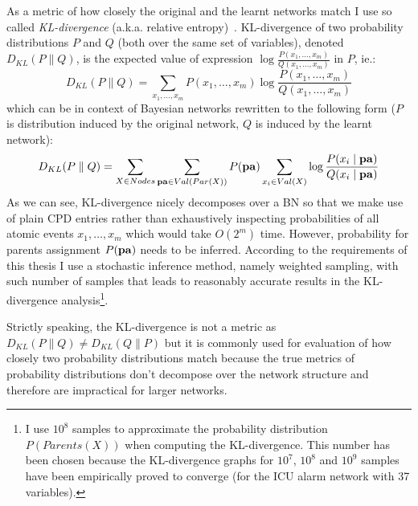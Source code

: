 \documentclass[english,cover]{fitthesis} %
\newcommand{\term}[1]{\emph{#1}}           %
\newcommand{\vars}[1]{{\bold{#1}}}         %
\begin{document}
As a metric of how closely the original and the learnt networks match I use so called \term{KL-divergence} (a.k.a. relative entropy)~\cite{pgm}. KL-divergence of two probability distributions $P$ and $Q$ (both over the same set of variables), denoted $D_{KL}(P \parallel Q)$, is the expected value of expression $\log \frac{P(x_1,\dots,x_m)}{Q(x_1,\dots,x_m)}$ in $P$, ie.:
\begin{equation*}
D_{KL}(P \parallel Q) = \sum_{x_1,\dots,x_m} P(x_1,\dots,x_m) \log \frac{P(x_1,\dots,x_m)}{Q(x_1,\dots,x_m)}
\end{equation*}
which can be in context of Bayesian networks rewritten to the following form ($P$ is distribution induced by the original network, $Q$ is induced by the learnt network):
\begin{equation*}
D_{KL}(P \parallel Q) = \sum_{X \in Nodes} \sum_{\vars{pa} \in Val(Par(X))} P(\vars{pa}) \sum_{x_i \in Val(X)} \log \frac{P(x_i \mid \vars{pa})}{Q(x_i \mid \vars{pa})}
\end{equation*}
As we can see, KL-divergence nicely decomposes over a BN so that we make use of plain CPD entries rather than exhaustively inspecting probabilities of all atomic events $x_1, \dots, x_m$ which would take $O(2^m)$ time. However, probability for parents assignment $P(\vars{pa})$ needs to be inferred. According to the requirements of this thesis I use a stochastic inference method, namely weighted sampling, with such number of samples that leads to reasonably accurate results in the KL-divergence analysis\footnote{I use $10^8$ samples to approximate the probability distribution $P(Parents(X))$ when computing the KL-divergence. This number has been chosen because the KL-divergence graphs for $10^7$, $10^8$ and $10^9$ samples have been empirically proved to converge (for the ICU alarm network with 37 variables).}.

Strictly speaking, the KL-divergence is not a metric as $D_{KL}(P \parallel Q) \neq D_{KL}(Q \parallel P)$ but it is commonly used for evaluation of how closely two probability distributions match because the true metrics of probability distributions don't decompose over the network structure and therefore are impractical for larger networks.
\end{document}
